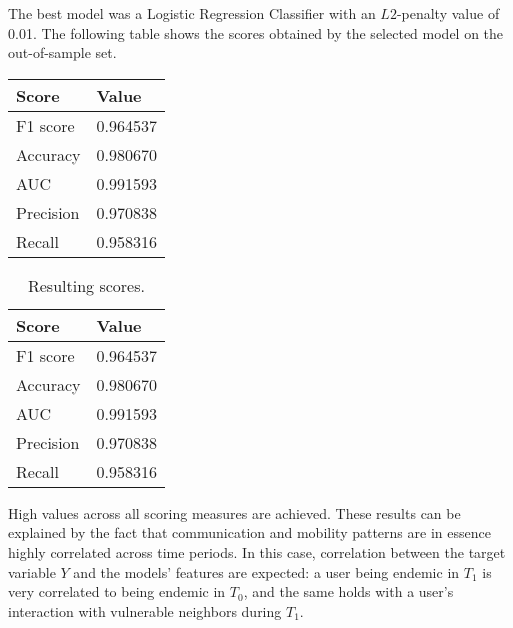 The best model was a Logistic Regression Classifier with an $L2$-penalty value of 0.01. 
The following table
shows the scores obtained by the selected model on the out-of-sample set.

\begin{center}
	\begin{tabular}{ l l }
		\toprule
		Score & Value \\
		\midrule
		F1 score & 0.964537  \\
		Accuracy & 0.980670  \\
		AUC    & 0.991593  \\
		Precision & 0.970838  \\
		Recall  & 0.958316  \\
		\bottomrule
	\end{tabular}
\end{center}


\begin{table}[ht]
	\caption{Resulting scores.}
	\label{tab:results}
	\centering
	\begin{tabular}{ l l }
		\toprule
		Score & Value \\
		\midrule
		F1 score & 0.964537  \\
		Accuracy & 0.980670  \\
		AUC    & 0.991593  \\
		Precision & 0.970838  \\
		Recall  & 0.958316  \\
		\bottomrule
	\end{tabular}
\end{table}

High values across all scoring measures are achieved. %
These results can be explained by the fact that 
communication and mobility patterns are in essence highly correlated across time periods. 
In this case, correlation between the target variable $Y$ and the models' features are expected:
a user being endemic in $T_1$ is very correlated to being endemic in $T_0$, and the same holds with a user's interaction with vulnerable neighbors during $T_1$.

